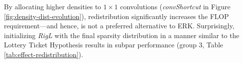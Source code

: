 By allocating higher densities to $1 \times 1$ convolutions (\textit{convShortcut} in Figure \ref{fig:density-dist-evolution}), redistribution significantly increases the FLOP requirement---and hence, is not a preferred alternative to ERK. Surprisingly, initializing \textit{RigL} with the final sparsity distribution in a manner similar to the Lottery Ticket Hypothesis results in subpar performance (group 3, Table \ref{tab:effect-redistribution}). 

